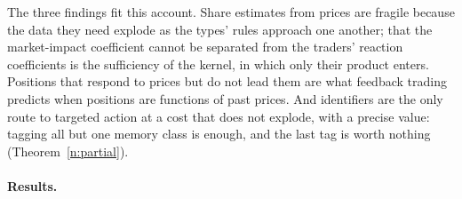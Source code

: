 The three findings fit this account. Share estimates from prices are fragile because the data they need explode as the types' rules approach one another; that the market-impact coefficient cannot be separated from the traders' reaction coefficients \citep{lux2018} is the sufficiency of the kernel, in which only their product enters. Positions that respond to prices but do not lead them are what feedback trading predicts when positions are functions of past prices. And identifiers are the only route to targeted action at a cost that does not explode, with a precise value: tagging all but one memory class is enough, and the last tag is worth nothing (Theorem~\ref{n:partial}).

\paragraph{Results.}
